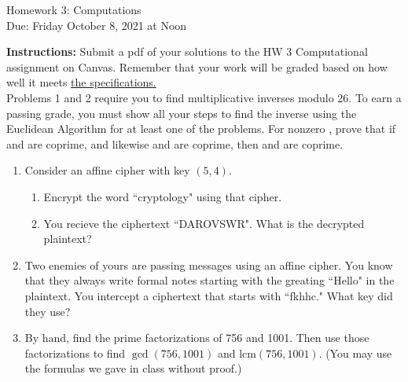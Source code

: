 \documentclass[10pt,a4paper]{article}
\begin{document}
\begin{center}
{\Large Homework 3: Computations}\\
Due: Friday October 8, 2021 at Noon\\


\end{center}
{\bf Instructions:} Submit a pdf of your solutions to the HW 3 Computational assignment on Canvas. Remember that your work will be graded based on how well it meets \href{https://docs.google.com/document/d/1emM06_WRh_h941rsjtRE9fRVndJtfRKd9gyS3Fs_rFA/edit?usp=sharing}{the specifications. }
\\[1em]

 Problems 1 and 2 require you to find multiplicative inverses modulo 26. To earn a passing grade, you must show all your steps to find the inverse using the Euclidean Algorithm for at least one of the problems. 
For nonzero , prove that if  and  are coprime, and likewise  and  are coprime, then  and  are coprime. 
\begin{enumerate}
\item Consider an affine cipher with key $(5,4)$. 
\begin{enumerate}
\item Encrypt the word ``cryptology" using that cipher. 
\item You recieve the ciphertext ``DAROVSWR". What is the decrypted plaintext?
\end{enumerate}

\item Two enemies of yours are passing messages using an affine cipher. You know that they always write formal notes starting with the greating ``Hello" in the plaintext.  You intercept a ciphertext that starts with ``fkhhc." What key did they use?

\item By hand, find the prime factorizations of 756 and 1001. Then use those factorizations to find $\gcd(756, 1001)$ and $\mathrm{lcm}(756, 1001)$. (You may use the formulas we gave in class without proof.) 

\end{enumerate}
\end{document}
